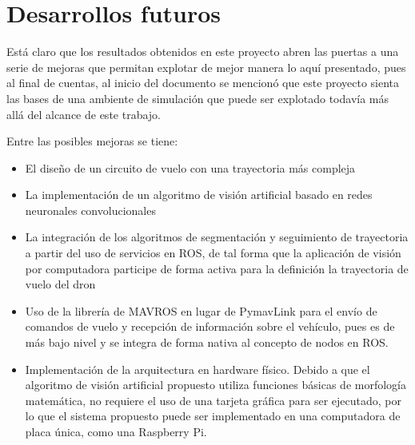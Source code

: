 \section{Desarrollos futuros}

Está claro que los resultados obtenidos en este proyecto abren las puertas a una serie de mejoras que permitan explotar de mejor manera lo aquí presentado, pues al final de cuentas, al inicio del documento se mencionó que este proyecto sienta las bases de una ambiente de simulación que puede ser explotado todavía más allá del alcance de este trabajo. 

Entre las posibles mejoras se tiene:

\begin{itemize}
    \item El diseño de un circuito de vuelo con una trayectoria más compleja
    \item La implementación de un algoritmo de visión artificial basado en redes neuronales convolucionales
    \item La integración de los algoritmos de segmentación y seguimiento de trayectoria a partir del uso de servicios en ROS, de tal forma que la aplicación de visión por computadora participe de forma activa para la definición la trayectoria de vuelo del dron
    \item Uso de la librería de MAVROS en lugar de PymavLink para el envío de comandos de vuelo y recepción de información sobre el vehículo, pues es de más bajo nivel y se integra de forma nativa al concepto de nodos en ROS.
    \item Implementación de la arquitectura en hardware físico. Debido a que el algoritmo de visión artificial propuesto utiliza funciones básicas de morfología matemática, no requiere el uso de una tarjeta gráfica para ser ejecutado, por lo que el sistema propuesto puede ser implementado en una computadora de placa única, como una Raspberry Pi.
\end{itemize}